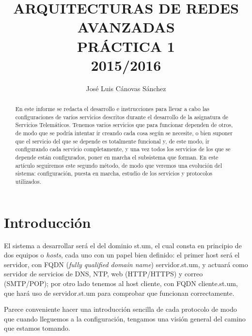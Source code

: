 \documentclass{article}
\author{José Luis Cánovas Sánchez}
\title{ARQUITECTURAS DE REDES AVANZADAS\\PRÁCTICA 1\\ 2015/2016}
\date{}
\begin{document}
\maketitle

\begin{abstract}
	En este informe se redacta el desarrollo e instrucciones para llevar a cabo las configuraciones de varios servicios descritos durante el desarrollo de la asignatura de Servicios Telemáticos. Tenemos varios servicios que para funcionar dependen de otros, de modo que se podría intentar ir creando cada cosa según se necesite, o bien suponer que el servicio del que se depende es totalmente funcional y, de este modo, ir configurando cada servicio completamente, y una vez todos los servicios de los que se depende están configurados, poner en marcha el subsistema que forman. En este artículo seguiremos este segundo método, de modo que veremos una evolución del sistema: configuración, puesta en marcha, estudio de los servicios y protocolos utilizados.
\end{abstract}

\tableofcontents
\section{Introducción}
El sistema a desarrollar será el del dominio st.um, el cual consta en principio de dos equipos o \textit{hosts}, cada uno con un papel bien definido: el primer host será el servidor, con FQDN (\textit{fully qualified domain name})  servidor.st.um, y actuará como servidor de servicios de DNS, NTP, web (HTTP/HTTPS) y correo (SMTP/POP); por otro lado tenemos al host cliente, con FQDN cliente.st.um, que hará uso de servidor.st.um para comprobar que funcionan correctamente.\par


Parece conveniente hacer una introducción sencilla de cada protocolo de modo que cuando lleguemos a la configuración, tengamos una visión general del camino que estamos tomando.\par
\end{document}
